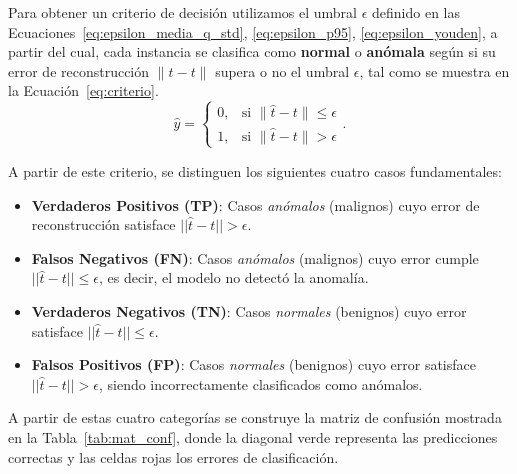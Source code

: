 \documentclass[a4paper,10pt]{book}
\begin{document}
Para obtener un criterio de decisión utilizamos el umbral $\epsilon$ definido en las Ecuaciones~\ref{eq:epsilon_media_q_std}, \ref{eq:epsilon_p95}, \ref{eq:epsilon_youden}, a partir del cual, cada instancia se clasifica como \textbf{normal} o \textbf{anómala} según si su error de reconstrucción $\lVert \hat{t} - t \rVert$ supera o no el umbral $\epsilon$, tal como se muestra en la Ecuación~\ref{eq:criterio}.
\begin{equation}
	\hat{y} =
	\begin{cases}
		0, & \text{si } \lVert \hat{t} - t \rVert \le \epsilon \\[4pt]
		1, & \text{si } \lVert \hat{t} - t \rVert > \epsilon
	\end{cases}.
	\label{eq:criterio}
\end{equation}

A partir de este criterio, se distinguen los siguientes cuatro casos fundamentales:

\begin{itemize}
	\item \textbf{Verdaderos Positivos (TP)}: Casos \emph{anómalos} (malignos) cuyo error de reconstrucción satisface $||\hat{t} - t|| > \epsilon$.
	
	\item \textbf{Falsos Negativos (FN)}: Casos \emph{anómalos} (malignos) cuyo error cumple $||\hat{t} - t|| \le \epsilon$, es decir, el modelo no detectó la anomalía.
	
	\item \textbf{Verdaderos Negativos (TN)}: Casos \emph{normales} (benignos) cuyo error satisface $||\hat{t} - t|| \le \epsilon$.
	
	\item \textbf{Falsos Positivos (FP)}: Casos \emph{normales} (benignos) cuyo error satisface $||\hat{t} - t|| > \epsilon$, siendo incorrectamente clasificados como anómalos.
\end{itemize}

A partir de estas cuatro categorías se construye la matriz de confusión mostrada en la Tabla~\ref{tab:mat_conf}, donde la diagonal verde representa las predicciones correctas y las celdas rojas los errores de clasificación.
\end{document}
